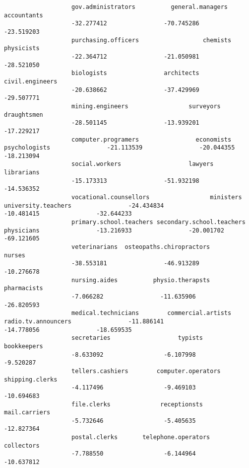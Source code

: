 \documentclass[12pt,letterpaper]{article}
\begin{document}
\begin{enumerate}
		\begin{verbatim}
			       gov.administrators          general.managers               accountants
			       -32.277412                -70.745286                -23.519203       
			       purchasing.officers                  chemists                physicists                
			       -22.364712                -21.050981                -28.521050                
			       biologists                architects           civil.engineers                
			       -20.638662                -37.429969                -29.507771          
			       mining.engineers                 surveyors               draughtsmen                
			       -28.501145                -13.939201                -17.229217       
			       computer.programers                economists             psychologists                -21.113539                -20.044355                -18.213094            
			       social.workers                   lawyers                librarians                
			       -15.173313                -51.932198                -14.536352    
			       vocational.counsellors                 ministers       university.teachers                -24.434834                -10.481415                -32.644233   
			       primary.school.teachers secondary.school.teachers                physicians                -13.216933                -20.001702                -69.121605             
			       veterinarians  osteopaths.chiropractors                    nurses                
			       -38.553181                -46.913289                -10.276678             
			       nursing.aides          physio.therapsts               pharmacists                 
			       -7.066282                -11.635906                -26.820593       
			       medical.technicians        commercial.artists       radio.tv.announcers                -11.886141                -14.778056                -18.659535               
			       secretaries                   typists               bookkeepers                 
			       -8.633092                 -6.107998                 -9.520287          
			       tellers.cashiers        computer.operators           shipping.clerks                 
			       -4.117496                 -9.469103                -10.694683               
			       file.clerks              receptionsts             mail.carriers                 
			       -5.732646                 -5.405635                -12.827364             
			       postal.clerks       telephone.operators                collectors                 
			       -7.788550                 -6.144964                -10.637812           

\end{verbatim}
\end{enumerate}
\end{document}
